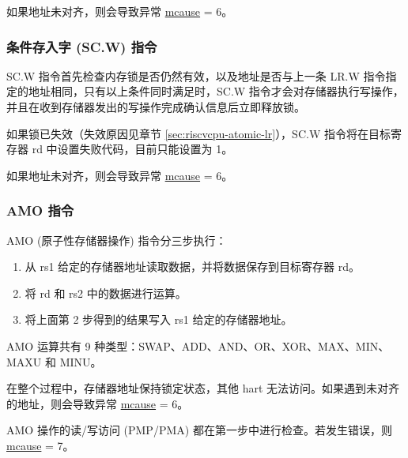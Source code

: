 \documentclass[main\_\_CN.tex]{subfiles}
\begin{document}
如果地址未对齐，则会导致异常 \hyperref[regdesc:MCAUSE]{mcause} = 6。

\subsubsection{条件存入字 (SC.W) 指令}
\label{sec:riscvcpu-atomic-sc}

SC.W 指令首先检查内存锁是否仍然有效，以及地址是否与上一条 LR.W 指令指定的地址相同，只有以上条件同时满足时，SC.W 指令才会对存储器执行写操作，并且在收到存储器发出的写操作完成确认信息后立即释放锁。

如果锁已失效（失效原因见章节 \ref{sec:riscvcpu-atomic-lr}），SC.W 指令将在目标寄存器 rd 中设置失败代码，目前只能设置为 1。

如果地址未对齐，则会导致异常 \hyperref[regdesc:MCAUSE]{mcause} = 6。

\subsubsection{AMO 指令}
\label{sec:riscvcpu-atomic-amo}

AMO (原子性存储器操作) 指令分三步执行：

\begin{enumerate}
     \item 从 rs1 给定的存储器地址读取数据，并将数据保存到目标寄存器 rd。
     \item 将 rd 和 rs2 中的数据进行运算。
     \item 将上面第 2 步得到的结果写入 rs1 给定的存储器地址。
\end{enumerate}

AMO 运算共有 9 种类型：SWAP、ADD、AND、OR、XOR、MAX、MIN、MAXU 和 MINU。

在整个过程中，存储器地址保持锁定状态，其他 hart 无法访问。如果遇到未对齐的地址，则会导致异常 \hyperref[regdesc:MCAUSE]{mcause} = 6。

AMO 操作的读/写访问 (PMP/PMA) 都在第一步中进行检查。若发生错误，则 \hyperref[regdesc:MCAUSE]{mcause} = 7。
\end{document}
